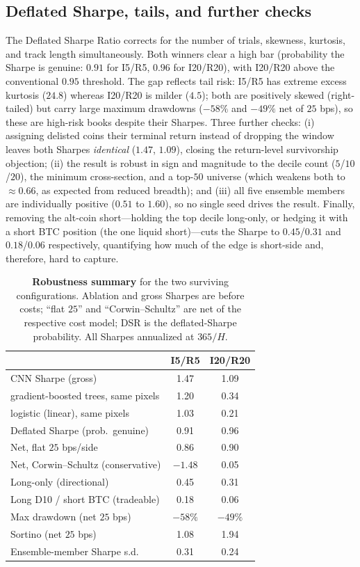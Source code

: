 \documentclass[11pt]{article}
\begin{document}
\subsection{Deflated Sharpe, tails, and further checks}
The \citet{bailey2014deflated} Deflated Sharpe Ratio corrects for the number of trials, skewness,
kurtosis, and track length simultaneously. Both winners clear a high bar (probability the Sharpe is
genuine: $0.91$ for I5/R5, $0.96$ for I20/R20), with I20/R20 above the conventional $0.95$ threshold.
The gap reflects tail risk: I5/R5 has extreme excess kurtosis ($24.8$) whereas I20/R20 is milder
($4.5$); both are positively skewed (right-tailed) but carry large maximum drawdowns ($-58\%$ and
$-49\%$ net of $25$ bps), so these are high-risk books despite their Sharpes. Three further checks:
(i) assigning delisted coins their terminal return instead of dropping the window leaves both Sharpes
\emph{identical} ($1.47$, $1.09$), closing the return-level survivorship objection; (ii) the result is
robust in sign and magnitude to the decile count ($5$/$10$/$20$), the minimum cross-section, and a
top-$50$ universe (which weakens both to $\approx\!0.66$, as expected from reduced breadth); and
(iii) all five ensemble members are individually positive ($0.51$ to $1.60$), so no single seed drives
the result. Finally, removing the alt-coin short---holding the top decile long-only, or hedging it
with a short BTC position (the one liquid short)---cuts the Sharpe to $0.45$/$0.31$ and $0.18$/$0.06$
respectively, quantifying how much of the edge is short-side and, therefore, hard to capture.

\begin{table}[t]
\centering
\caption{\textbf{Robustness summary} for the two surviving configurations. Ablation and gross Sharpes
are before costs; ``flat $25$'' and ``Corwin--Schultz'' are net of the respective cost model; DSR is
the deflated-Sharpe probability. All Sharpes annualized at $365/H$.}
\label{tab:robust}
\small
\begin{tabular}{lcc}
\toprule
& \textbf{I5/R5} & \textbf{I20/R20} \\
\midrule
CNN Sharpe (gross)                 & 1.47 & 1.09 \\
\quad gradient-boosted trees, same pixels & 1.20 & 0.34 \\
\quad logistic (linear), same pixels      & 1.03 & 0.21 \\
Deflated Sharpe (prob.\ genuine)   & 0.91 & 0.96 \\
Net, flat $25$ bps/side            & 0.86 & 0.90 \\
Net, Corwin--Schultz (conservative)& $-1.48$ & 0.05 \\
Long-only (directional)            & 0.45 & 0.31 \\
Long D10 / short BTC (tradeable)   & 0.18 & 0.06 \\
Max drawdown (net $25$ bps)        & $-58\%$ & $-49\%$ \\
Sortino (net $25$ bps)             & 1.08 & 1.94 \\
Ensemble-member Sharpe s.d.        & 0.31 & 0.24 \\
\bottomrule
\end{tabular}
\end{table}
\end{document}
